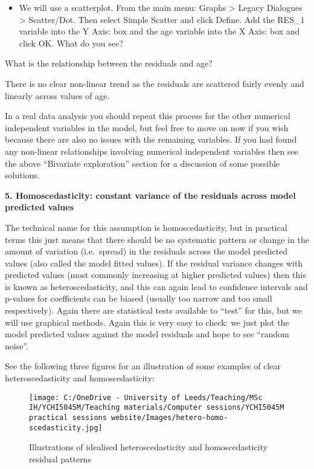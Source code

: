 \documentclass[
]{book}
\providecommand{\tightlist}{%
  \setlength{\itemsep}{0pt}\setlength{\parskip}{0pt}}
\begin{document}
\begin{itemize}
\tightlist
\item
  We will use a scatterplot. From the main menu: Graphs \textgreater{} Legacy Dialogues \textgreater{} Scatter/Dot. Then select Simple Scatter and click Define. Add the RES\_1 variable into the Y Axis: box and the age variable into the X Axis: box and click OK. What do you see?
\end{itemize}

What is the relationship between the residuals and age?

There is no clear non-linear trend as the residuals are scattered fairly evenly and linearly across values of age.

In a real data analysis you should repeat this process for the other numerical independent variables in the model, but feel free to move on now if you wish because there are also no issues with the remaining variables. If you had found any non-linear relationships involving numerical independent variables then see the above ``Bivariate exploration'' section for a discussion of some possible solutions.

\textbf{5. Homoscedasticity: constant variance of the residuals across model predicted values}

The technical name for this assumption is homoscedasticity, but in practical terms this just means that there should be no systematic pattern or change in the amount of variation (i.e.~spread) in the residuals across the model predicted values (also called the model fitted values). If the residual variance changes with predicted values (most commonly increasing at higher predicted values) then this is known as heteroscedasticity, and this can again lead to confidence intervals and p-values for coefficients can be biased (usually too narrow and too small respectively). Again there are statistical tests available to ``test'' for this, but we will use graphical methods. Again this is very easy to check: we just plot the model predicted values against the model residuals and hope to see ``random noise''.

See the following three figures for an illustration of some examples of clear heteroscedasticity and homoscedasticity:

\begin{figure}
\centering
\texttt{[image: C:/OneDrive - University of Leeds/Teaching/MSc IH/YCHI5045M/Teaching materials/Computer sessions/YCHI5045M practical sessions website/Images/hetero-homo-scedasticity.jpg]}
\caption{Illustrations of idealised heteroscedasticity and homoscedasticity residual patterns}
\end{figure}
\end{document}
